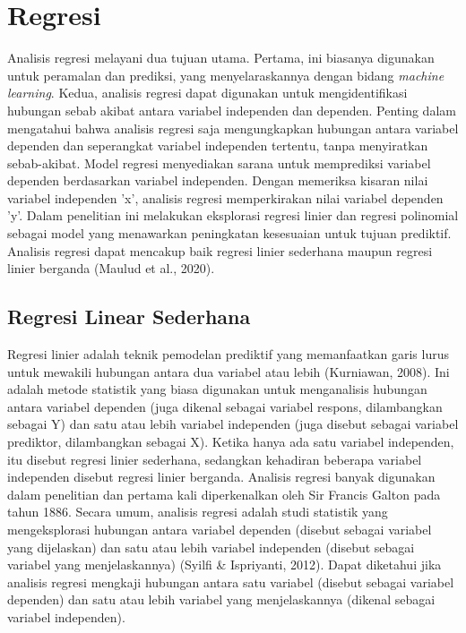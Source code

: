 \section{Regresi}
\label{sec:regresi}

Analisis regresi melayani dua tujuan utama. Pertama, ini biasanya digunakan untuk peramalan dan prediksi, yang menyelaraskannya dengan bidang \emph{machine learning}. Kedua, analisis regresi dapat digunakan untuk mengidentifikasi hubungan sebab akibat antara variabel independen dan dependen. Penting dalam mengatahui bahwa analisis regresi saja mengungkapkan hubungan antara variabel dependen dan seperangkat variabel independen tertentu, tanpa menyiratkan sebab-akibat. Model regresi menyediakan sarana untuk memprediksi variabel dependen berdasarkan variabel independen. Dengan memeriksa kisaran nilai variabel independen 'x', analisis regresi memperkirakan nilai variabel dependen 'y'. Dalam penelitian ini melakukan eksplorasi regresi linier dan regresi polinomial sebagai model yang menawarkan peningkatan kesesuaian untuk tujuan prediktif. Analisis regresi dapat mencakup baik regresi linier sederhana maupun regresi linier berganda (Maulud et al., 2020).

\subsection{Regresi Linear Sederhana}
\label{subsec:regresilinearsederhana}

Regresi linier adalah teknik pemodelan prediktif yang memanfaatkan garis lurus untuk mewakili hubungan antara dua variabel atau lebih (Kurniawan, 2008). Ini adalah metode statistik yang biasa digunakan untuk menganalisis hubungan antara variabel dependen (juga dikenal sebagai variabel respons, dilambangkan sebagai Y) dan satu atau lebih variabel independen (juga disebut sebagai variabel prediktor, dilambangkan sebagai X). Ketika hanya ada satu variabel independen, itu disebut regresi linier sederhana, sedangkan kehadiran beberapa variabel independen disebut regresi linier berganda. Analisis regresi banyak digunakan dalam penelitian dan pertama kali diperkenalkan oleh Sir Francis Galton pada tahun 1886. Secara umum, analisis regresi adalah studi statistik yang mengeksplorasi hubungan antara variabel dependen (disebut sebagai variabel yang dijelaskan) dan satu atau lebih variabel independen (disebut sebagai variabel yang menjelaskannya) (Syilfi \& Ispriyanti, 2012). Dapat diketahui jika analisis regresi mengkaji hubungan antara satu variabel (disebut sebagai variabel dependen) dan satu atau lebih variabel yang menjelaskannya (dikenal sebagai variabel independen).

